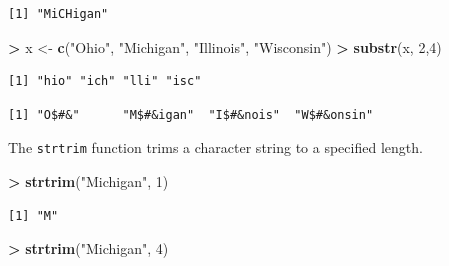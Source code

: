 \documentclass[
]{krantz}
\makeatletter
\newenvironment{Shaded}{\begin{snugshade}}{\end{snugshade}}
\newcommand{\DecValTok}[1]{\textcolor[rgb]{0.06,0.06,0.06}{#1}}
\newcommand{\KeywordTok}[1]{\textcolor[rgb]{0.27,0.27,0.27}{\textbf{#1}}}
\newcommand{\NormalTok}[1]{#1}
\newcommand{\OperatorTok}[1]{\textcolor[rgb]{0.43,0.43,0.43}{\textbf{#1}}}
\newcommand{\StringTok}[1]{\textcolor[rgb]{0.5,0.5,0.5}{#1}}
\newenvironment{kframe}{%
\medskip{}
\setlength{\fboxsep}{.8em}
 \def\at@end@of@kframe{}%
 \ifinner\ifhmode%
  \def\at@end@of@kframe{\end{minipage}}%
  \begin{minipage}{\columnwidth}%
 \fi\fi%
 \def\FrameCommand##1{\hskip\@totalleftmargin \hskip-\fboxsep
 \colorbox{shadecolor}{##1}\hskip-\fboxsep
     \hskip-\linewidth \hskip-\@totalleftmargin \hskip\columnwidth}%
 \MakeFramed {\advance\hsize-\width
   \@totalleftmargin\z@ \linewidth\hsize
   \@setminipage}}%
 {\par\unskip\endMakeFramed%
 \at@end@of@kframe}
\renewenvironment{Shaded}{\begin{kframe}}{\end{kframe}}
\makeatother
\begin{document}
\begin{verbatim}
[1] "MiCHigan"
\end{verbatim}

\begin{Shaded}
\begin{Highlighting}[]
\OperatorTok{\textgreater{}}\StringTok{ }\NormalTok{x \textless{}{-}}\StringTok{ }\KeywordTok{c}\NormalTok{(}\StringTok{"Ohio"}\NormalTok{, }\StringTok{"Michigan"}\NormalTok{, }\StringTok{"Illinois"}\NormalTok{, }\StringTok{"Wisconsin"}\NormalTok{)}
\OperatorTok{\textgreater{}}\StringTok{ }\KeywordTok{substr}\NormalTok{(x, }\DecValTok{2}\NormalTok{,}\DecValTok{4}\NormalTok{)}
\end{Highlighting}
\end{Shaded}

\begin{verbatim}
[1] "hio" "ich" "lli" "isc"
\end{verbatim}

\begin{Shaded}
\end{Shaded}

\begin{verbatim}
[1] "O$#&"      "M$#&igan"  "I$#&nois"  "W$#&onsin"
\end{verbatim}

The \texttt{strtrim} function trims a character string to a specified length.

\begin{Shaded}
\begin{Highlighting}[]
\OperatorTok{\textgreater{}}\StringTok{ }\KeywordTok{strtrim}\NormalTok{(}\StringTok{"Michigan"}\NormalTok{, }\DecValTok{1}\NormalTok{)}
\end{Highlighting}
\end{Shaded}

\begin{verbatim}
[1] "M"
\end{verbatim}

\begin{Shaded}
\begin{Highlighting}[]
\OperatorTok{\textgreater{}}\StringTok{ }\KeywordTok{strtrim}\NormalTok{(}\StringTok{"Michigan"}\NormalTok{, }\DecValTok{4}\NormalTok{)}
\end{Highlighting}
\end{Shaded}
\end{document}
